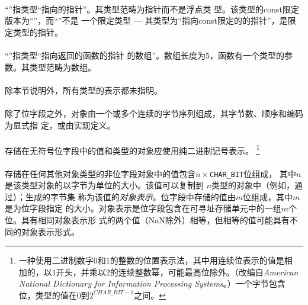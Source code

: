 \paragraph{}
\ex ``''指类型``指向的指针''。其类型范畴为指针而不是浮点类
型。该类型的const限定版本为``''，而``''不是
一个限定类型 --- 其类型为``指向const限定的的指针''，是限定类型的指针。

\paragraph{}
\ex ``''指类型``指向返回的函数的指针
的数组''。数组长度为$5$，函数有一个类型的参数。其类型范畴为数组。


\paragraph{}
除本节说明外，所有类型的表示都未指明。

\paragraph{}
除了位字段之外，对象由一个或多个连续的字节序列组成，其字节数、顺序和编码为显式指
定，或由实现定义。

\paragraph{}
存储在无符号位字段中的值和类型的对象应使用纯二进制记号表示。
\footnote{一种使用二进制数字$0$和$1$的整数的位置表示法，其中用连续位表示的值是相
加的，以$1$开头，并乘以$2$的连续整数幂，可能最高位除外。（改编自\textit{American
National Dictionary for Information Processing Systems}。）一个字节包含
位，类型的值在$0$到$2^{CHAR\_BIT-1}$之间。}

\paragraph{}
存储在任何其他对象类型的非位字段对象中的值包含$n\times$\texttt{CHAR\_BIT}位组成，
其中$n$是该类型对象的以字节为单位的大小。该值可以复制到
\tm{unsigned char[}$n$\tm{]}类型的对象中（例如，通过）；生成的字节集
称为该值的\textit{对象表示}。位字段中存储的值由$m$位组成，其中$m$是为位字段指定
的大小。对象表示是位字段包含在可寻址存储单元中的一组$m$个位。具有相同对象表示形
式的两个值（NaN除外）相等，但相等的值可能具有不同的对象表示形式。

